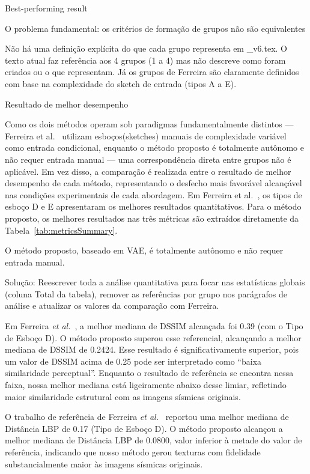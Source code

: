 Best-performing result


O problema fundamental: os critérios de formação de grupos não são equivalentes

Não há uma definição explícita do que cada grupo representa em _v6.tex. O texto atual faz referência aos 4 grupos (1 a 4) mas não descreve como foram criados ou o que representam. Já os grupos de Ferreira são claramente definidos com base na complexidade do sketch de entrada (tipos A a E).


Resultado de melhor desempenho

Como os dois métodos operam sob paradigmas fundamentalmente distintos --- Ferreira et al.~\cite{Ferreira2020} utilizam esboços(sketches) manuais de complexidade variável como entrada condicional, enquanto o método proposto é totalmente autônomo e não requer entrada manual --- uma correspondência direta entre grupos não é aplicável. Em vez disso, a comparação é realizada entre o resultado de melhor desempenho de cada método, representando o desfecho mais favorável alcançável nas condições experimentais de cada abordagem. Em Ferreira et al.~\cite{Ferreira2020}, os tipos de esboço D e E apresentaram os melhores resultados quantitativos. Para o método proposto, os melhores resultados nas três métricas são extraídos diretamente da Tabela~\ref{tab:metricsSummary}. 

O método proposto, baseado em VAE, é totalmente autônomo e não requer entrada manual.

Solução: Reescrever toda a análise quantitativa para focar nas estatísticas globais (coluna Total da tabela), remover as referências por grupo nos parágrafos de análise e atualizar os valores da comparação com Ferreira.

Em Ferreira \emph{et al.}~\cite{Ferreira2020}, a melhor mediana de DSSIM alcançada foi 0.39 (com o Tipo de Esboço D). O método proposto superou esse referencial, alcançando a melhor mediana de DSSIM de 0.2424. Esse resultado é significativamente superior, pois um valor de DSSIM acima de 0.25 pode ser interpretado como ``baixa similaridade perceptual''. Enquanto o resultado de referência se encontra nessa faixa, nossa melhor mediana está ligeiramente abaixo desse limiar, refletindo maior similaridade estrutural com as imagens sísmicas originais.

O trabalho de referência de Ferreira \emph{et al.}~\cite{Ferreira2020} reportou uma melhor mediana de Distância LBP de 0.17 (Tipo de Esboço D). O método proposto alcançou a melhor mediana de Distância LBP de 0.0800, valor inferior à metade do valor de referência, indicando que nosso método gerou texturas com fidelidade substancialmente maior às imagens sísmicas originais.








